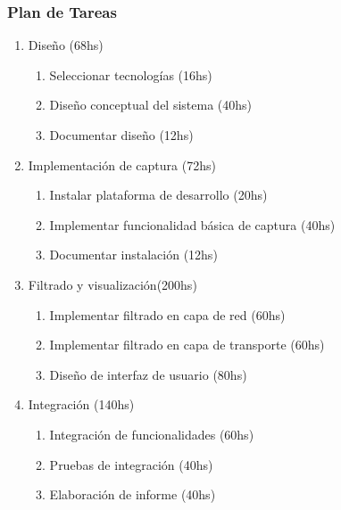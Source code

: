 \subsubsection*{Plan de Tareas}
\begin{enumerate}
	\item Diseño (68hs)
	\begin{enumerate}
		\item Seleccionar tecnologías (16hs)
		\item Diseño conceptual del sistema (40hs)
		\item Documentar diseño (12hs)
	\end{enumerate}
	\item Implementación de captura (72hs)
	\begin{enumerate}
		\item Instalar plataforma de desarrollo (20hs)
		\item Implementar funcionalidad básica de captura (40hs)
		\item Documentar instalación (12hs)
	\end{enumerate}
	\item Filtrado y visualización(200hs)
	\begin{enumerate}
		\item Implementar filtrado en capa de red (60hs)
		\item Implementar filtrado en capa de transporte (60hs)
		\item Diseño de interfaz de usuario (80hs)
	\end{enumerate}
	\item Integración (140hs)
	\begin{enumerate}
		\item Integración de funcionalidades (60hs)
		\item Pruebas de integración (40hs)
		\item Elaboración de informe (40hs)
	\end{enumerate}
\end{enumerate}

